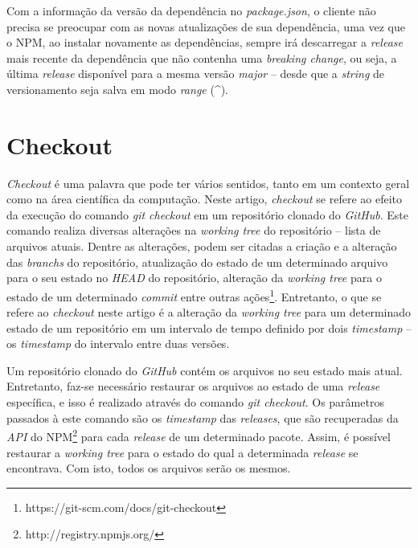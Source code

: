 Com a informação da versão da dependência no \textit{package.json}, o cliente não precisa se preocupar com as novas atualizações de sua dependência, uma vez que o \gls{NPM}, ao instalar novamente as dependências, sempre irá descarregar a \textit{release} mais recente da dependência que não contenha uma \textit{breaking change}, ou seja, a última \textit{release} disponível para a mesma versão \textit{major} -- desde que a \textit{string} de versionamento seja salva em modo \textit{range} (\textasciicircum).

\section{Checkout}
\label{ref-teo:checkout}
\textit{Checkout} é uma palavra que pode ter vários sentidos, tanto em um contexto geral como na área científica da computação. Neste artigo, \textit{checkout} se refere ao efeito da execução do comando \textit{git checkout} em um repositório clonado do \textit{GitHub}. Este comando realiza diversas alterações na \textit{working tree} do repositório -- lista de arquivos atuais. Dentre as alterações, podem ser citadas a criação e a alteração das \textit{branchs} do repositório, atualização do estado de um determinado arquivo para o seu estado no \textit{HEAD} do repositório, alteração da \textit{working tree} para o estado de um determinado \textit{commit} entre outras ações\footnote{https://git-scm.com/docs/git-checkout}. Entretanto, o que se refere ao \textit{checkout} neste artigo é a alteração da \textit{working tree} para um determinado estado de um repositório em um intervalo de tempo definido por dois \textit{timestamp} -- os \textit{timestamp} do intervalo entre duas versões.

Um repositório clonado do \textit{GitHub} contém os arquivos no seu estado mais atual. Entretanto, faz-se necessário restaurar os arquivos ao estado de uma \textit{release} específica, e isso é realizado através do comando \textit{git checkout}. Os parâmetros passados à este comando são os \textit{timestamp} das \textit{releases}, que são recuperadas da \textit{API} do \gls{NPM}\footnote{http://registry.npmjs.org/} para cada \textit{release} de um determinado pacote. Assim, é possível restaurar a \textit{working tree} para o estado do qual a determinada \textit{release} se encontrava. Com isto, todos os arquivos serão os mesmos.

